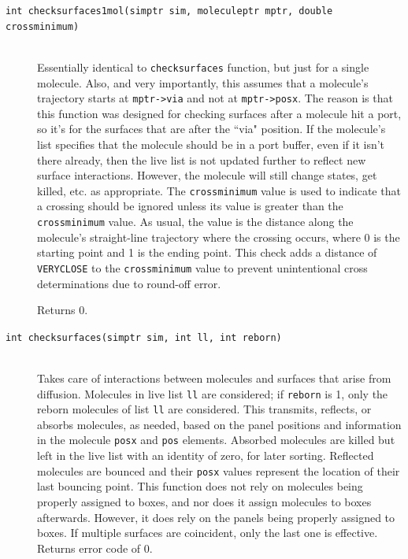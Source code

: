 \documentclass {scrbook}
\newcommand {\ttt} {\texttt}
\begin{document}
\begin{description}
\item[\ttt{int checksurfaces1mol(simptr sim, moleculeptr mptr, double crossminimum)}]
\hfill \\
Essentially identical to \ttt{checksurfaces} function, but just for a single molecule. Also, and very importantly, this assumes that a molecule's trajectory starts at \ttt{mptr->via} and not at \ttt{mptr->posx}. The reason is that this function was designed for checking surfaces after a molecule hit a port, so it's for the surfaces that are after the ``via" position. If the molecule's list specifies that the molecule should be in a port buffer, even if it isn't there already, then the live list is not updated further to reflect new surface interactions. However, the molecule will still change states, get killed, etc. as appropriate. The \ttt{crossminimum} value is used to indicate that a crossing should be ignored unless its value is greater than the \ttt{crossminimum} value. As usual, the value is the distance along the molecule's straight-line trajectory where the crossing occurs, where 0 is the starting point and 1 is the ending point. This check adds a distance of \ttt{VERYCLOSE} to the \ttt{crossminimum} value to prevent unintentional cross determinations due to round-off error.

Returns 0.

\item[\ttt{int checksurfaces(simptr sim, int ll, int reborn)}]
\hfill \\
Takes care of interactions between molecules and surfaces that arise from diffusion. Molecules in live list \ttt{ll} are considered; if \ttt{reborn} is 1, only the reborn molecules of list \ttt{ll} are considered. This transmits, reflects, or absorbs molecules, as needed, based on the panel positions and information in the molecule \ttt{posx} and \ttt{pos} elements. Absorbed molecules are killed but left in the live list with an identity of zero, for later sorting. Reflected molecules are bounced and their \ttt{posx} values represent the location of their last bouncing point. This function does not rely on molecules being properly assigned to boxes, and nor does it assign molecules to boxes afterwards. However, it does rely on the panels being properly assigned to boxes. If multiple surfaces are coincident, only the last one is effective. Returns error code of 0.


\end{description}
\end{document}
